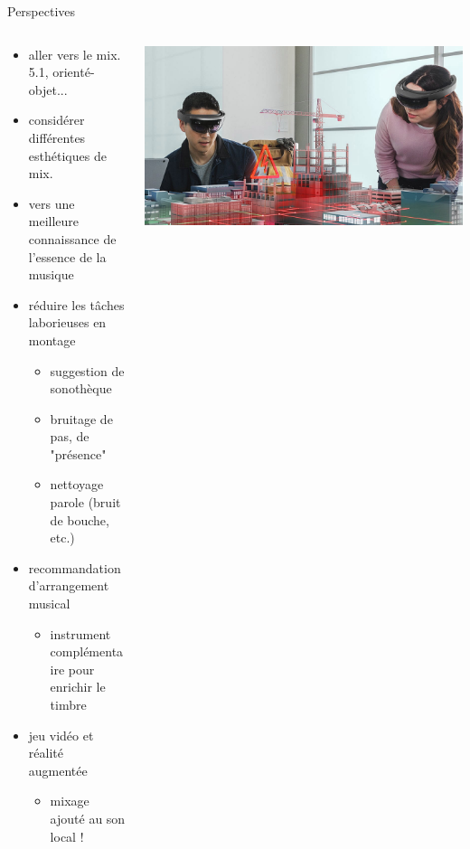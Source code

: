 \documentclass[9pt, aspectratio=169]{beamer}
\begin{document}
\begin{frame}{Perspectives} %
\begin{columns}
    \begin{column}{0.58\textwidth}
		\begin{itemize}
	\item aller vers le mix. 5.1, orienté-objet...
	\item considérer différentes esthétiques de mix.
	\item vers une meilleure connaissance de l'essence de la musique
	\item réduire les tâches laborieuses en montage
		\begin{itemize}
			\item suggestion de sonothèque
			\item bruitage de pas, de "présence"
			\item nettoyage parole (bruit de bouche, etc.)
		\end{itemize}
	\item recommandation d'arrangement musical
	\begin{itemize}
		\item instrument complémentaire pour enrichir le timbre
	\end{itemize}
	\item jeu vidéo et réalité augmentée
	\begin{itemize}
		\item mixage ajouté au son local !
	\end{itemize}
\end{itemize}
    \end{column}
    \begin{column}{0.4\textwidth}
		\includegraphics[width=\textwidth]{fig/microsoft-hololens-ar.jpg}
    \end{column}
\end{columns}
\end{frame}
\end{document}
